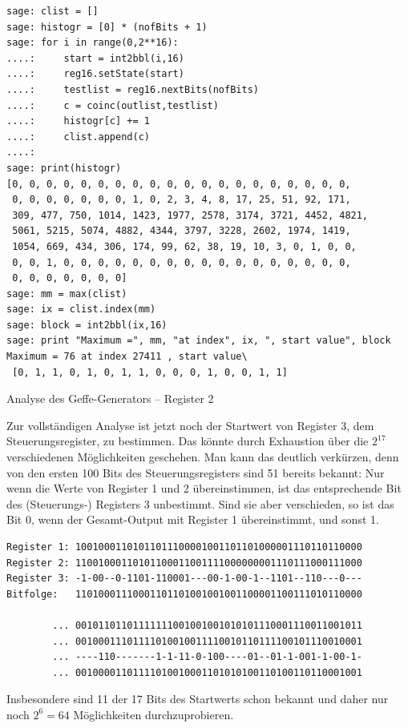 \begin{refsegment}
\begin{sagecode}
\begin{verbatim}
sage: clist = []
sage: histogr = [0] * (nofBits + 1)
sage: for i in range(0,2**16):
....:     start = int2bbl(i,16)
....:     reg16.setState(start)
....:     testlist = reg16.nextBits(nofBits)
....:     c = coinc(outlist,testlist)
....:     histogr[c] += 1
....:     clist.append(c)
....:
sage: print(histogr)
[0, 0, 0, 0, 0, 0, 0, 0, 0, 0, 0, 0, 0, 0, 0, 0, 0, 0, 0, 0,
 0, 0, 0, 0, 0, 0, 0, 1, 0, 2, 3, 4, 8, 17, 25, 51, 92, 171,
 309, 477, 750, 1014, 1423, 1977, 2578, 3174, 3721, 4452, 4821,
 5061, 5215, 5074, 4882, 4344, 3797, 3228, 2602, 1974, 1419,
 1054, 669, 434, 306, 174, 99, 62, 38, 19, 10, 3, 0, 1, 0, 0,
 0, 0, 1, 0, 0, 0, 0, 0, 0, 0, 0, 0, 0, 0, 0, 0, 0, 0, 0, 0,
 0, 0, 0, 0, 0, 0, 0]
sage: mm = max(clist)
sage: ix = clist.index(mm)
sage: block = int2bbl(ix,16)
sage: print "Maximum =", mm, "at index", ix, ", start value", block
Maximum = 76 at index 27411 , start value\
 [0, 1, 1, 0, 1, 0, 1, 1, 0, 0, 0, 1, 0, 0, 1, 1]
\end{verbatim}
\caption{Analyse des Geffe-Generators -- Register 2}\label{Sage-code-bool-gef-ana2}
\end{sagecode}
\clearpage

Zur vollständigen Analyse ist jetzt noch der Startwert von Register 3,
dem Steuerungsregister, zu bestimmen. Das könnte durch Exhaustion über
die $2^{17}$ verschiedenen Möglichkeiten geschehen. Man kann das
deutlich verkürzen, denn von den ersten 100 Bits des Steuerungsregisters
sind 51 bereits bekannt: Nur wenn die Werte von Register 1 und 2 übereinstimmen,
ist das entsprechende Bit des (Steuerungs-) Registers 3 unbestimmt. Sind
sie aber verschieden, so ist das Bit 0, wenn der Gesamt-Output mit
Register 1 übereinstimmt, und sonst 1.
\begin{verbatim}
Register 1: 10010001101011011100001001101101000001110110110000
Register 2: 11001000110101100011001111000000001110111000111000
Register 3: -1-00--0-1101-110001---00-1-00-1--1101--110---0---
Bitfolge:   11010001110001101101001001001100001100111010110000

        ... 00101101101111111001001001010101110001110011001011
        ... 00100011101111010010011110010110111100101110010001
        ... ----110-------1-1-11-0-100----01--01-1-001-1-00-1-
        ... 00100001101111010010001101010100110100110110001001
\end{verbatim}
Insbesondere sind 11 der 17 Bits des Startwerts schon bekannt und
daher nur noch $2^6 = 64$ Möglichkeiten durchzuprobieren.


\end{refsegment}
